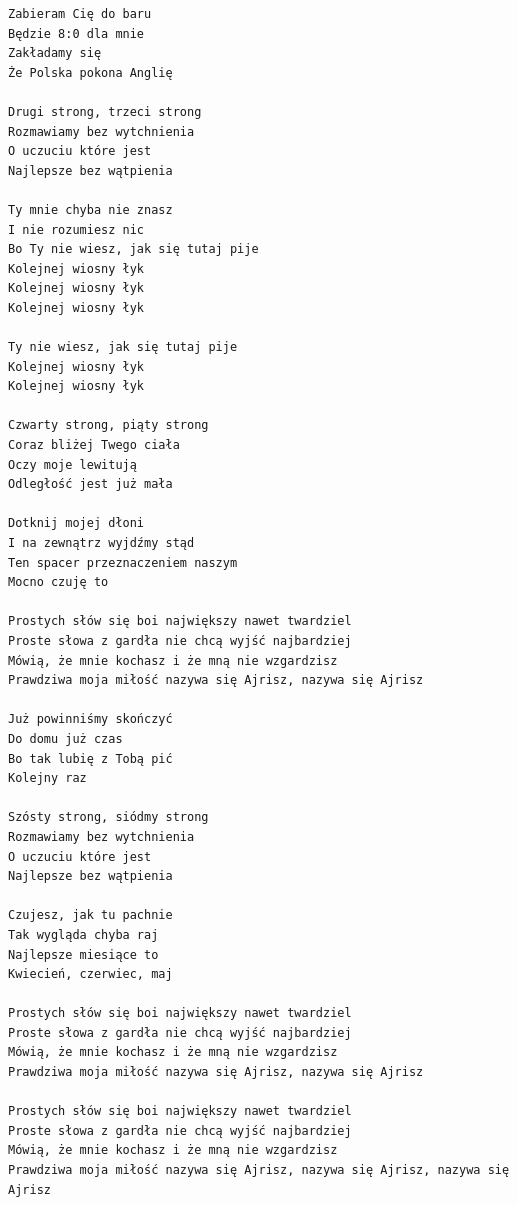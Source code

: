 \documentclass[12pt]{article}
\begin{document}
\begin{verbatim}
Zabieram Cię do baru
Będzie 8:0 dla mnie
Zakładamy się
Że Polska pokona Anglię

Drugi strong, trzeci strong
Rozmawiamy bez wytchnienia
O uczuciu które jest
Najlepsze bez wątpienia

Ty mnie chyba nie znasz
I nie rozumiesz nic
Bo Ty nie wiesz, jak się tutaj pije
Kolejnej wiosny łyk
Kolejnej wiosny łyk
Kolejnej wiosny łyk

Ty nie wiesz, jak się tutaj pije
Kolejnej wiosny łyk
Kolejnej wiosny łyk

Czwarty strong, piąty strong
Coraz bliżej Twego ciała
Oczy moje lewitują
Odległość jest już mała

Dotknij mojej dłoni
I na zewnątrz wyjdźmy stąd
Ten spacer przeznaczeniem naszym
Mocno czuję to

Prostych słów się boi największy nawet twardziel
Proste słowa z gardła nie chcą wyjść najbardziej
Mówią, że mnie kochasz i że mną nie wzgardzisz
Prawdziwa moja miłość nazywa się Ajrisz, nazywa się Ajrisz

Już powinniśmy skończyć
Do domu już czas
Bo tak lubię z Tobą pić
Kolejny raz

Szósty strong, siódmy strong
Rozmawiamy bez wytchnienia
O uczuciu które jest
Najlepsze bez wątpienia

Czujesz, jak tu pachnie
Tak wygląda chyba raj
Najlepsze miesiące to
Kwiecień, czerwiec, maj

Prostych słów się boi największy nawet twardziel
Proste słowa z gardła nie chcą wyjść najbardziej
Mówią, że mnie kochasz i że mną nie wzgardzisz
Prawdziwa moja miłość nazywa się Ajrisz, nazywa się Ajrisz

Prostych słów się boi największy nawet twardziel
Proste słowa z gardła nie chcą wyjść najbardziej
Mówią, że mnie kochasz i że mną nie wzgardzisz
Prawdziwa moja miłość nazywa się Ajrisz, nazywa się Ajrisz, nazywa się Ajrisz
\end{verbatim}
\clearpage
\end{document}
